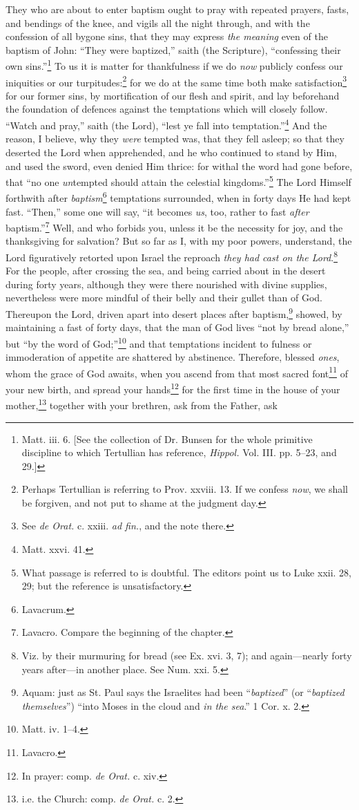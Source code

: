 They who are about to enter baptism ought to pray with repeated prayers, fasts, and bendings of the knee, and vigils all the night through, and with the confession of all bygone sins, that they may express \emph{the meaning} even of the baptism of John: “They were baptized,” saith (the Scripture), “confessing their own sins.”\footnote{Matt. iii. 6. [See the collection of Dr. Bunsen for the whole primitive discipline to which Tertullian has reference, \emph{Hippol.} Vol. III. pp. 5–23, and 29.]} To us it is matter for thankfulness if we do \emph{now} publicly confess our iniquities or our turpitudes:\footnote{Perhaps Tertullian is referring to Prov. xxviii. 13. If we confess \emph{now}, we shall be forgiven, and not put to shame at the judgment day.} for we do at the same time both make satisfaction\footnote{See \emph{de Orat.} c. xxiii. \emph{ad fin.}, and the note there.} for our former sins, by mortification of our flesh and spirit, and lay beforehand the foundation of defences against the temptations which will closely follow. “Watch and pray,” saith (the Lord), “lest ye fall into temptation.”\footnote{Matt. xxvi. 41.} And the reason, I believe, why they \emph{were} tempted was, that they fell asleep; so that they deserted the Lord when apprehended, and he who continued to stand by Him, and used the sword, even denied Him thrice: for withal the word had gone before, that “no one \emph{un}tempted should attain the celestial kingdoms.”\footnote{What passage is referred to is doubtful. The editors point us to Luke xxii. 28, 29; but the reference is unsatisfactory.} The Lord Himself forthwith after \emph{baptism}\footnote{Lavacrum.} temptations surrounded, when in forty days He had kept fast. “Then,” some one will say, “it becomes \emph{us}, too, rather to fast \emph{after} baptism.”\footnote{Lavacro. Compare the beginning of the chapter.} Well, and who forbids you, unless it be the necessity for joy, and the thanksgiving for salvation? But so far as I, with my poor powers, understand, the Lord figuratively retorted upon Israel the reproach \emph{they had cast on the Lord}.\footnote{Viz. by their murmuring for bread (see Ex. xvi. 3, 7); and again—nearly forty years after—in another place. See Num. xxi. 5.} For the people, after crossing the sea, and being carried about in the desert during forty years, although they were there nourished with divine supplies, nevertheless were more mindful of their belly and their gullet than of God. Thereupon the Lord, driven apart into desert places after baptism,\footnote{Aquam: just as St. Paul says the Israelites had been “\emph{baptized}” (or “\emph{baptized themselves}”) “into Moses in the cloud and \emph{in the sea}.” 1 Cor. x. 2.} showed, by maintaining a fast of forty days, that the man of God lives “not by bread alone,” but “by the word of God;”\footnote{Matt. iv. 1–4.} and that temptations incident to fulness or immoderation of appetite are shattered by abstinence. Therefore, blessed \emph{ones}, whom the grace of God awaits, when you ascend from that most sacred font\footnote{Lavacro.} of your new birth, and spread your hands\footnote{In prayer: comp. \emph{de Orat.} c. xiv.} for the first time in the house of your mother,\footnote{i.e. the Church: comp. \emph{de Orat.} c. 2.} together with your brethren, ask from the Father, ask 